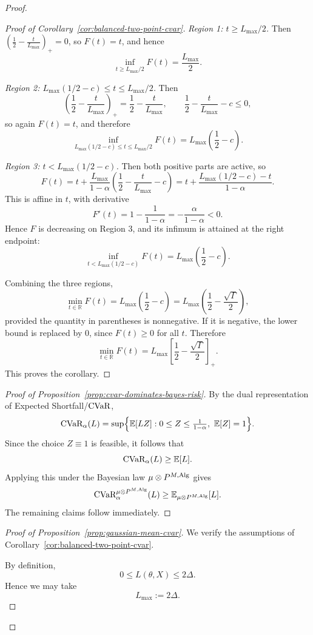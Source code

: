 \documentclass[conference]{IEEEtran}
\begin{document}
\begin{proof}[Proof]
\begin{proof}[Proof of Corollary~\ref{cor:balanced-two-point-cvar}]
\smallskip
\noindent
\emph{Region 1: \(t\ge L_{\max}/2\).}
Then \(\left(\frac12-\frac{t}{L_{\max}}\right)_+=0\), so \(F(t)=t\), and hence
\[
\inf_{t\ge L_{\max}/2}F(t)=\frac{L_{\max}}{2}.
\]

\smallskip
\noindent
\emph{Region 2: \(L_{\max}(1/2-c)\le t\le L_{\max}/2\).}
Then
\[
\left(\frac12-\frac{t}{L_{\max}}\right)_+=\frac12-\frac{t}{L_{\max}},
\qquad
\frac12-\frac{t}{L_{\max}}-c\le 0,
\]
so again \(F(t)=t\), and therefore
\[
\inf_{L_{\max}(1/2-c)\le t\le L_{\max}/2}F(t)
=
L_{\max}\left(\frac12-c\right).
\]

\smallskip
\noindent
\emph{Region 3: \(t<L_{\max}(1/2-c)\).}
Then both positive parts are active, so
\[
F(t)
=
t+\frac{L_{\max}}{1-\alpha}\left(\frac12-\frac{t}{L_{\max}}-c\right)
=
t+\frac{L_{\max}(1/2-c)-t}{1-\alpha}.
\]
This is affine in \(t\), with derivative
\[
F'(t)=1-\frac{1}{1-\alpha}=-\frac{\alpha}{1-\alpha}<0.
\]
Hence \(F\) is decreasing on Region 3, and its infimum is attained at the right endpoint:
\[
\inf_{t<L_{\max}(1/2-c)}F(t)
=
L_{\max}\left(\frac12-c\right).
\]

Combining the three regions,
\[
\min_{t\in\mathbb{R}}F(t)
=
L_{\max}\left(\frac12-c\right)
=
L_{\max}\left(\frac12-\frac{\sqrt{\Gamma}}{2}\right),
\]
provided the quantity in parentheses is nonnegative. If it is negative, the lower bound is replaced by \(0\), since \(F(t)\ge 0\) for all \(t\). Therefore
\[
\min_{t\in\mathbb{R}}F(t)
=
L_{\max}\left[\frac12-\frac{\sqrt{\Gamma}}{2}\right]_+.
\]
This proves the corollary.
\end{proof}

\begin{proof}[Proof of Proposition~\ref{prop:cvar-dominates-bayes-risk}]
By the dual representation of Expected Shortfall/\(\textup{CVaR}\),
\[
\textup{CVaR}_\alpha(L)
=
\sup\Bigl\{
\mathbb{E}[LZ]:
0\le Z\le \tfrac{1}{1-\alpha},\ \mathbb{E}[Z]=1
\Bigr\}.
\]
Since the choice \(Z\equiv 1\) is feasible, it follows that
\[
\textup{CVaR}_\alpha(L)\ge \mathbb{E}[L].
\]
Applying this under the Bayesian law \(\mu\otimes P^{M,\textup{Alg}}\) gives
\[
\textup{CVaR}_\alpha^{\mu\otimes P^{M,\textup{Alg}}}(L)
\ge
\mathbb{E}_{\mu\otimes P^{M,\textup{Alg}}}[L].
\]
The remaining claims follow immediately.
\end{proof}

\begin{proof}[Proof of Proposition~\ref{prop:gaussian-mean-cvar}]
We verify the assumptions of Corollary~\ref{cor:balanced-two-point-cvar}.

\medskip
\noindent
{}
By definition,
\[
0\le L(\theta,X)\le 2\Delta.
\]
Hence we may take
\[
L_{\max}:=2\Delta.
\]


\end{proof}
\end{proof}
\end{document}
